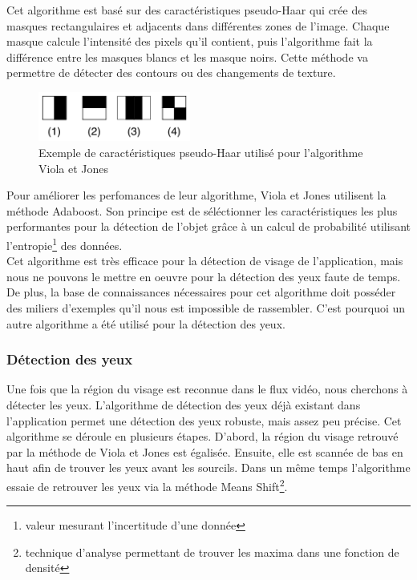 Cet algorithme est basé sur des caractéristiques pseudo-Haar qui crée des masques rectangulaires et adjacents
dans différentes zones de l'image. Chaque masque calcule l'intensité des pixels qu'il contient, puis l'algorithme fait
la différence entre les masques blancs et les masque noirs. Cette méthode va permettre de détecter des contours ou des changements de 
texture.\\

\begin{figure}[H]
\center
\includegraphics[width=5cm]{image/pseudo_haar.png}
\caption{Exemple de caractéristiques pseudo-Haar utilisé pour l'algorithme Viola et Jones}
\end{figure}

Pour améliorer les perfomances de leur algorithme, Viola et Jones utilisent la méthode Adaboost. Son
principe est de séléctionner les caractéristiques les plus performantes pour la détection de l'objet grâce à
un calcul de probabilité utilisant l'entropie\footnote{valeur mesurant l'incertitude d'une donnée} des données.\\

Cet algorithme est très efficace pour la détection de visage de l'application, mais nous ne pouvons le mettre
en oeuvre pour la détection des yeux faute de temps. De plus, la base de connaissances nécessaires pour cet 
algorithme doit posséder des miliers d'exemples qu'il nous est impossible de rassembler. C'est pourquoi
un autre algorithme a été utilisé pour la détection des yeux.

\subsubsection{Détection des yeux}
Une fois que la région du visage est reconnue dans le flux vidéo, nous cherchons à détecter les yeux. 
L'algorithme de détection des yeux déjà existant dans l'application permet une détection des yeux 
robuste, mais assez peu précise. Cet algorithme se déroule en plusieurs étapes. D'abord, la région du visage 
retrouvé par la méthode de Viola et Jones est égalisée. Ensuite, elle est scannée de bas en haut afin de
trouver les yeux avant les sourcils. Dans un même temps l'algorithme essaie de retrouver les yeux via la
méthode Means Shift\footnote{technique d'analyse permettant de trouver les maxima dans une fonction de densité}.



